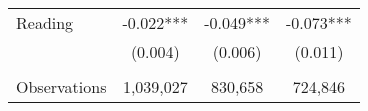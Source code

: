 {\begin{tabular}{lccc}
\hspace{3mm}Reading &      -0.022***&      -0.049***&      -0.073***\\
                    &     (0.004)   &     (0.006)   &     (0.011)   \\
                    &               &               &               \\
\hspace{3mm}Observations&   1,039,027   &     830,658   &     724,846   \\
 

\bottomrule
\end{tabular}
}
